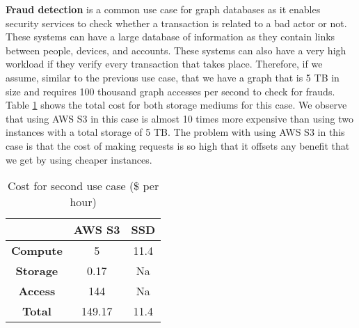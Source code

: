 \medskip
\textbf{Fraud detection} is a common use case for graph databases as it enables
security services to check whether a transaction is related to a bad actor or
not. These systems can have a large database of information as they contain
links between people, devices, and accounts. These systems can also have a very
high workload if they verify every transaction that takes place. Therefore, if
we assume, similar to the previous use case, that we have a graph that is
5 TB in size and requires 100 thousand graph accesses per second to check for
frauds. Table \ref{table:costFraudDetection} shows the total cost for both
storage mediums for this case. We observe that using AWS S3 in this case is
almost 10 times more expensive than using two instances with a total storage of
5 TB. The problem with using AWS S3 in this case is that the cost of making
requests is so high that it offsets any benefit that we get by using
cheaper instances.

\begin{table}[h!]
 \centering
 \begin{tabular}{|c | c | c |} 
 \hline
  & AWS S3 & SSD \\ [0.5ex] 
 \hline\hline
     \textbf{Compute} & 5 & 11.4 \\ 
     \textbf{Storage} & 0.17 & Na \\
     \textbf{Access} &  144 & Na \\
     \hline
     \textbf{Total} & 149.17 & 11.4 \\
 \hline
 \end{tabular}
 \caption{Cost for second use case (\$ per hour)}
 \label{table:costFraudDetection}
\end{table}

